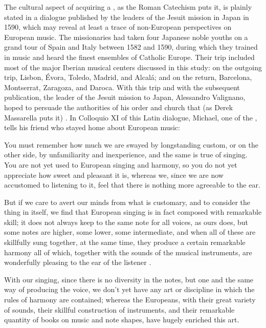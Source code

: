 
The cultural aspect of acquiring a , as the Roman
Catechism puts it, is plainly stated in a dialogue published by the leaders of
the Jesuit mission in Japan in 1590, which may reveal at least a trace of
non-European perspectives on European music.%
    \Autocite{Sande:DeMissioneLegatorum}
The missionaries had taken four Japanese noble youths on a grand tour of Spain
and Italy between 1582 and 1590, during which they trained in music and heard
the finest ensembles of Catholic Europe.
Their trip included most of the major Iberian musical centers discussed in this
study: on the outgoing trip, Lisbon, Évora, Toledo, Madrid, and Alcalá; and on
the return, Barcelona, Montserrat, Zaragoza, and Daroca.
With this trip and with the subsequent publication, the leader of the Jesuit
mission to Japan, Alessandro Valignano, hoped to persuade the authorities of his
order and church that (as Derek Massarella puts it) .%
    \Autocite[4]{Massarella:JapaneseTravellers}
In Colloquio XI of this Latin dialogue, Michael, one of the
, tells his friend who stayed home about European music:
\begin{quoting}
    You must remember \Dots{} how much we are swayed by longstanding custom, or
    on the other side, by unfamiliarity and inexperience, and the same is true
    of singing.
    You are not yet used to European singing and harmony, so you do not yet
    appreciate how sweet and pleasant it is, whereas we, since we are now
    accustomed to listening to it, feel that there is nothing more agreeable to
    the ear.

    But if we care to avert our minds from what is customary, and to consider
    the thing in itself, we find that European singing is in fact composed with
    remarkable skill; it does not always keep to the same note for all voices,
    as ours does, but some notes are higher, some lower, some intermediate, and
    when all of these are skillfully sung together, at the same time, they
    produce a certain remarkable harmony \Dots{} all of which, \Dots{} together
    with the sounds of the musical instruments, are wonderfully pleasing to the
    ear of the listener \Dots{}.

    With our singing, since there is no diversity in the notes, but one and the
    same way of producing the voice, we don't yet have any art or discipline in
    which the rules of harmony are contained; whereas the Europeans, with their
    great variety of sounds, their skillful construction of instruments, and
    their remarkable quantity of books on music and note shapes, have hugely
    enriched this art.%
        \Autocite[155--156]{Massarella:JapaneseTravellers}
\end{quoting}

